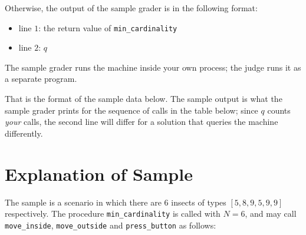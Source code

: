 Otherwise, the output of the sample grader is in the following format:
\begin{itemize}
  \item line $1$: the return value of \texttt{min\_cardinality}
  \item line $2$: $q$
\end{itemize}

The sample grader runs the machine inside your own process; the judge runs it as a separate program.

That is the format of the sample data below. The sample output is what the sample grader prints for
the sequence of calls in the table below; since $q$ counts \emph{your} calls, the second line will
differ for a solution that queries the machine differently.

\section*{Explanation of Sample}
The sample is a scenario in which there are $6$ insects of types $[5, 8, 9, 5, 9, 9]$ respectively.
The procedure \texttt{min\_cardinality} is called with $N = 6$, and may call \texttt{move\_inside},
\texttt{move\_outside} and \texttt{press\_button} as follows:

